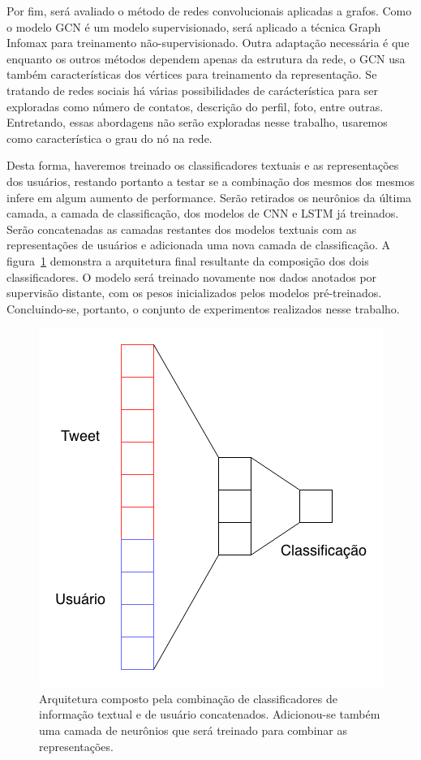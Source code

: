 Por fim, será avaliado o método de redes convolucionais aplicadas a grafos.
Como o modelo GCN é um modelo supervisionado, será aplicado a técnica Graph
Infomax para treinamento não-supervisionado.
Outra adaptação necessária é que enquanto os outros métodos dependem apenas da
estrutura da rede, o GCN usa também características dos vértices para
treinamento da representação.
Se tratando de redes sociais há várias possibilidades de carácterística para ser
exploradas como número de contatos, descrição do perfil, foto, entre outras.
Entretando, essas abordagens não serão exploradas nesse trabalho, usaremos como
característica o grau do nó na rede.

Desta forma, haveremos treinado os classificadores textuais e as representações
dos usuários, restando portanto a testar se a combinação dos mesmos dos mesmos
infere em algum aumento de performance.
Serão retirados os neurônios da última camada, a camada de classificação, dos
modelos de CNN e LSTM já treinados.
Serão concatenadas as camadas restantes dos modelos textuais com as
representações de usuários e adicionada uma nova camada de classificação.
A figura~\ref{fig:network_composition} demonstra a arquitetura final resultante
da composição dos dois classificadores.
O modelo será treinado novamente nos dados anotados por supervisão distante, com
os pesos inicializados pelos modelos pré-treinados.
Concluindo-se, portanto, o conjunto de experimentos realizados nesse trabalho.

\begin{figure}[h]
\begin{center} {
    \begin{center}
    \includegraphics[scale=0.45]{images/network_composition.png}
    \caption{Arquitetura composto pela combinação de classificadores de
        informação textual e de usuário concatenados. Adicionou-se também uma
        camada de neurônios que será treinado para combinar as representações.}
    \label{fig:network_composition}
    \end{center}
}
\end{center}
\end{figure}
